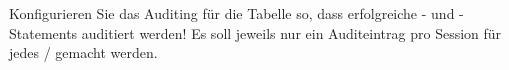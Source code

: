     \item Konfigurieren Sie das Auditing f\"ur die Tabelle  so, dass erfolgreiche - und -Statements auditiert werden! Es soll jeweils nur ein Auditeintrag pro Session f\"ur jedes  / gemacht werden.
